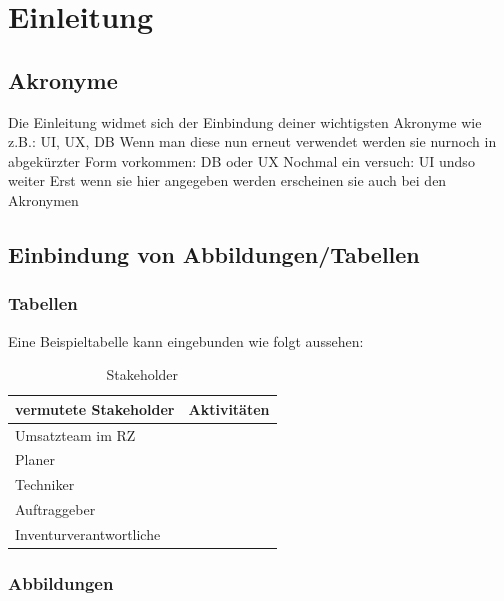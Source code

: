 \chapter{Einleitung}

\section{Akronyme}

Die Einleitung widmet sich der Einbindung deiner wichtigsten Akronyme wie z.B.: 
\gls{UI}, \gls{UX}, \gls{DB}
Wenn man diese nun erneut verwendet werden sie nurnoch in abgekürzter Form vorkommen: 
\gls{DB} oder \gls{UX}
Nochmal ein versuch: \gls{UI} undso weiter
Erst wenn sie hier angegeben werden erscheinen sie auch bei den Akronymen

\section{Einbindung von Abbildungen/Tabellen}
\subsection{Tabellen}

Eine Beispieltabelle kann eingebunden wie folgt aussehen: 
\begin{table}[h]
\centering
\begin{tabular}{|l|l|}
\hline
\textbf{vermutete Stakeholder} & \textbf{Aktivitäten}  \\ \hline
Umsatzteam im RZ        &             \\ \hline
Planer                  &             \\ \hline
Techniker               &             \\ \hline
Auftraggeber            &             \\ \hline
Inventurverantwortliche &             \\ \hline
\end{tabular}
\caption{Stakeholder}
\end{table}

\subsection{Abbildungen}

